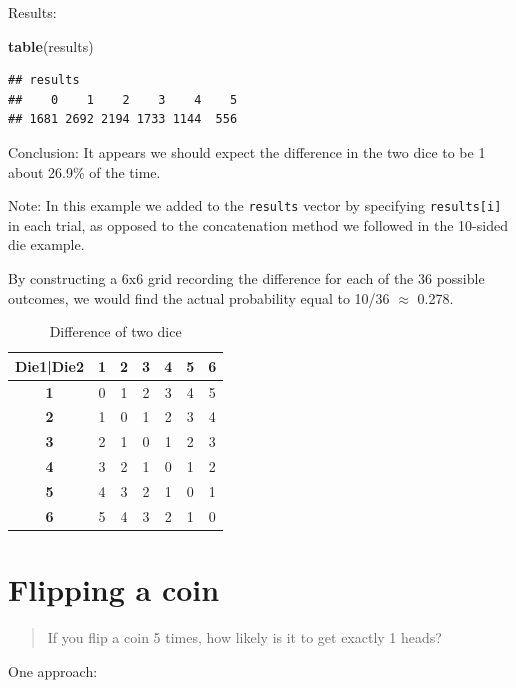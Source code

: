 \documentclass[
]{book}
\newenvironment{Shaded}{\begin{snugshade}}{\end{snugshade}}
\newcommand{\FunctionTok}[1]{\textcolor[rgb]{0.13,0.29,0.53}{\textbf{#1}}}
\newcommand{\NormalTok}[1]{#1}
\theoremstyle{definition}
\theoremstyle{definition}
\theoremstyle{definition}
\theoremstyle{definition}
\theoremstyle{remark}
\begin{document}
Results:

\begin{Shaded}
\begin{Highlighting}[]
\FunctionTok{table}\NormalTok{(results)}
\end{Highlighting}
\end{Shaded}

\begin{verbatim}
## results
##    0    1    2    3    4    5 
## 1681 2692 2194 1733 1144  556
\end{verbatim}

Conclusion: It appears we should expect the difference in the two dice to be 1 about 26.9\% of the time.

Note: In this example we added to the \texttt{results} vector by specifying \texttt{results{[}i{]}} in each trial, as opposed to the concatenation method we followed in the 10-sided die example.

By constructing a 6x6 grid recording the difference for each of the 36 possible outcomes, we would find the actual probability equal to 10/36 \(\approx\) 0.278.

\begin{table}
\centering
\caption{\label{tab:unnamed-chunk-104}Difference of two dice}
\centering
\begin{tabular}[t]{>{}c||>{}c|c|c|c|c|c}
\hline
Die1|Die2 & 1 & 2 & 3 & 4 & 5 & 6\\
\hline
\textbf{1} & 0 & 1 & 2 & 3 & 4 & 5\\
\hline
\textbf{2} & 1 & 0 & 1 & 2 & 3 & 4\\
\hline
\textbf{3} & 2 & 1 & 0 & 1 & 2 & 3\\
\hline
\textbf{4} & 3 & 2 & 1 & 0 & 1 & 2\\
\hline
\textbf{5} & 4 & 3 & 2 & 1 & 0 & 1\\
\hline
\textbf{6} & 5 & 4 & 3 & 2 & 1 & 0\\
\hline
\end{tabular}
\end{table}

\section{Flipping a coin}\label{flip-coin-R}

\begin{quote}
If you flip a coin 5 times, how likely is it to get exactly 1 heads?
\end{quote}

One approach:
\end{document}
